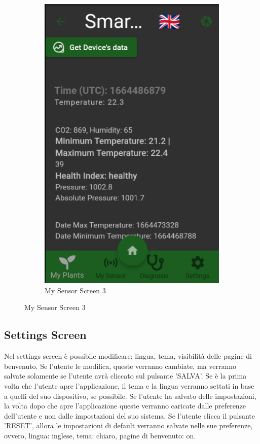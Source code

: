 \documentclass[a4paper,12pt]{report}
\begin{document}
\begin{figure}[H]
\begin{subfigure}{0.3\textwidth}
		\includegraphics[width=\textwidth]{./images/my_sensor/my_sensor_screen5.png}
		\caption{My Sensor Screen 3} %
		\label{fig:my_sensor4}
	\end{subfigure}
\end{figure}

\subsection{Settings Screen}

\textsf{\small Nel settings screen è possibile modificare: lingua, tema, visibilità delle pagine di benvenuto.}
\textsf{\small Se l'utente le modifica, queste verranno cambiate, ma verranno salvate solamente se l'utente avrà cliccato sul pulsante 'SALVA'.}
\textsf{\small Se è la prima volta che l'utente apre l'applicazione, il tema e la lingua verranno settati in base a quelli del suo dispositivo, se possibile.}
\textsf{\small Se l'utente ha salvato delle impostazioni, la volta dopo che apre l'applicazione queste verranno caricate dalle preferenze dell'utente e non dalle impostazioni del suo sistema.}
\textsf{\small Se l'utente clicca il pulsante 'RESET', allora le impostazioni di default verranno salvate nelle sue preferenze, ovvero, lingua: inglese, tema: chiaro, pagine di benvenuto: on.}
\end{document}
